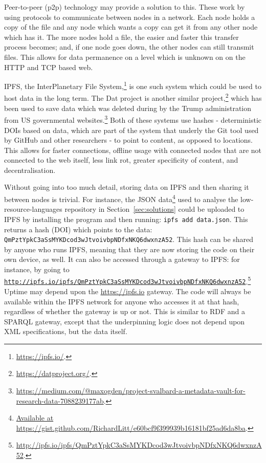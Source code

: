 Peer-to-peer (p2p) technology may provide a solution to this. These work by using protocols to communicate between nodes in a network. Each node holds a copy of the file and any node which wants a copy can get it from any other node which has it. The more nodes hold a file, the easier and faster this transfer process becomes; and, if one node goes down, the other nodes can still transmit files. This allows for data permanence on a level which is unknown on on the HTTP and TCP based web.

IPFS, the InterPlanetary File System,\footnote{\href{https://ipfs.io/}{https://ipfs.io/}. } is one such system which could be used to host data in the long term. The Dat project is another similar project,\footnote{\href{https://datproject.org/}{https://datproject.org/}. } which has been used to save data which was deleted during by the Trump administration from US governmental websites.\footnote{\href{https://medium.com/@maxogden/project-svalbard-a-metadata-vault-for-research-data-7088239177ab}{https://medium.com/@maxogden/project-svalbard-a-metadata-vault-for-research-data-7088239177ab}. } Both of these systems use hashes - deterministic DOIs based on data, which are part of the system that underly the Git tool used by GitHub and other researchers - to point to content, as opposed to locations. This allows for faster connections, offline usage with connected nodes that are not connected to the web itself, less link rot, greater specificity of content, and decentralisation.

Without going into too much detail, storing data on IPFS and then sharing it between nodes is trivial. For instance, the JSON data\footnote{\href{https://gist.github.com/RichardLitt/e60bcf9f399939b16181bf25ad6da8ba}{Available at https://gist.github.com/RichardLitt/e60bcf9f399939b16181bf25ad6da8ba}. } used to analyse the low-resource-languages repository in Section~\ref{sec:solutions} could be uploaded to IPFS by installing the program and then running: {\tt ipfs add data.json}. This returns a hash (DOI) which points to the data: {\tt QmPztYpkC3aSs\-MYKDcod\-3wJtvoivbp\-NDfxNKQ6dwxnzA52}. This hash can be shared by anyone who runs IPFS, meaning that they are now storing the code on their own device, as well. It can also be accessed through a gateway to IPFS: for instance, by going to \href{http://ipfs.io/ipfs/QmPztYpkC3aSsMYKDcod3wJtvoivbpNDfxNKQ6dwxnzA52}{\nolinkurl{http://ipfs.io/ipfs/QmPztYpkC3aSsMYKDcod3wJtvoivbpNDfxNKQ6dwxnzA52}}.\footnote{\href{http://ipfs.io/ipfs/QmPztYpkC3aSsMYKDcod3wJtvoivbpNDfxNKQ6dwxnzA52}{http://ipfs.io/ipfs/QmPztYpkC3aSsMYKDcod3wJtvoivbpNDfxNKQ6dwxnzA52}. } Uptime may depend upon the \href{https://ipfs.io}{https://ipfs.io} gateway. The code will always be available within the IPFS network for anyone who accesses it at that hash, regardless of whether the gateway is up or not. This is similar to RDF and a SPARQL gateway, except that the underpinning logic does not depend upon XML specifications, but the data itself.

